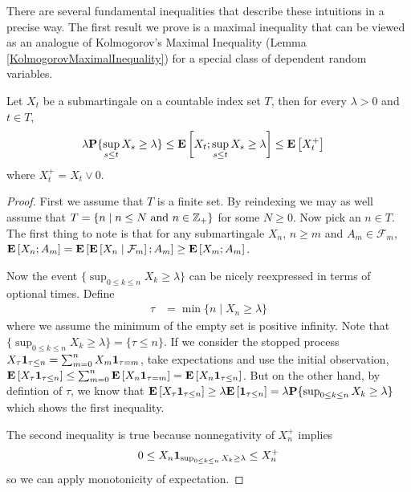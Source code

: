 There are several fundamental inequalities that describe
these intuitions in a precise way.  The first result we prove is a maximal
inequality that can be viewed as an analogue of Kolmogorov's Maximal
Inequality (Lemma \ref{KolmogorovMaximalInequality}) for a special
class of dependent random variables.
\begin{lem}\label{DoobMaximalInequalityDiscrete}Let $X_t$ be a
  submartingale on a countable index set $T$, then for every $\lambda
  > 0$ and $t \in T$,
\begin{align*}
\lambda \probability{\sup_{s \leq t} X_s \geq \lambda} &\leq
\expectation{X_t ; \sup_{s \leq t} X_s  \geq \lambda} \leq \expectation{X_t^+}
\end{align*}
where $X_t^+ = X_t \vee 0$.
\end{lem}
\begin{proof}
First we assume that $T$ is a finite set.  By reindexing we may as
well assume that $T = \lbrace n \mid n \leq N \text{ and } n \in
\integers_+ \rbrace$ for some $N \geq 0$.  Now pick an $n \in T$.
The first thing to note is that for any submartingale $X_n$, $n\geq m$ and $A_m
\in \mathcal{F}_m$, $\expectation{X_n ; A_m} =
\expectation{\cexpectationlong{\mathcal{F}_m}{X_n} ; A_m}
\geq \expectation{X_m ; A_m}$.

Now the event $\lbrace \sup_{0 \leq k \leq n} X_k \geq \lambda
\rbrace$ can be nicely reexpressed in terms of optional times.  Define
\begin{align*}
\tau &= \min \lbrace  n \mid X_n \geq \lambda \rbrace
\end{align*}
where we assume the minimum of the empty set is positive infinity. 
Note that $\lbrace \sup_{0 \leq k \leq n} X_k \geq \lambda
\rbrace = \lbrace \tau \leq n \rbrace$.  If we consider the stopped
process $X_\tau \characteristic{\tau \leq n} = \sum_{m=0}^n X_m
\characteristic{\tau = m}$, take expectations and use the initial
observation,
$\expectation{X_\tau \characteristic{\tau \leq n}} \leq \sum_{m=0}^n
\expectation{X_n \characteristic{\tau = m}} = \expectation {X_n
  \characteristic{\tau \leq n}}$.  But on the other hand, by defintion
of $\tau$, we know that $\expectation{X_\tau \characteristic{\tau \leq
    n}} \geq \lambda \expectation{\characteristic{\tau \leq n}} =
\lambda \probability{\sup_{0 \leq k \leq n} X_k \geq \lambda}$ which
shows the first inequality.

The second inequality is true because nonnegativity of $X_n^+$ implies 
\begin{align*}
0 \leq X_n
\characteristic{\sup_{0 \leq k \leq n} X_k \geq \lambda} \leq X_n^+
\end{align*} so we can apply
monotonicity of expectation.


\end{proof}
